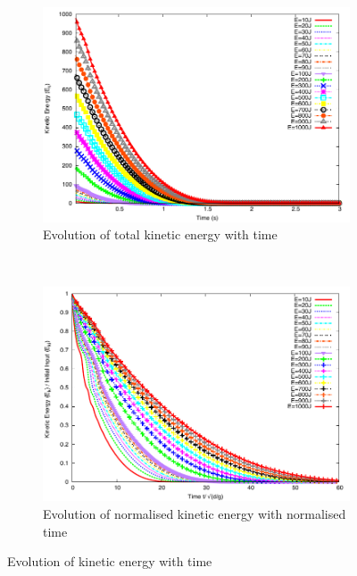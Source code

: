\begin{figure}[tbhp]
\centering
\begin{subfigure}[b]{0.975\textwidth}
\includegraphics[width=\textwidth]{Energy_Slope}
\caption{Evolution of total kinetic energy with time}
\label{fig:energy_slope}
\end{subfigure}
\\
\begin{subfigure}[b]{0.975\textwidth}
\centering
\includegraphics[width=\textwidth]{Normalised_Energy_Time_Slope}
\caption{Evolution of normalised kinetic energy with normalised time}
\label{fig:Normalised_Energy_Time_Slope}
\end{subfigure}
\caption{Evolution of kinetic energy with time}
\label{fig:Energy_Time_Slope}
\end{figure}

